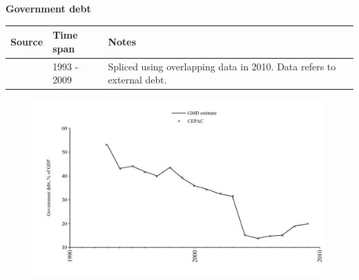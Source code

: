\documentclass[12pt,a4paper,landscape]{article}
\begin{document}
\begin{adjustbox}{max totalsize={\paperwidth}{\paperheight},center}
\begin{minipage}[t][\textheight][t]{\textwidth}
\vspace*{0.5cm}
{}
\begin{center}
{\Large\bfseries Government debt}
\end{center}
\vspace{0.5cm}
\begin{table}[H]
\centering
\small
\begin{tabular}{|l|l|l|}
\hline
\textbf{Source} & \textbf{Time span} & \textbf{Notes} \\
\hline
\rowcolor{white}\cite{CEPAC}& 1993 - 2009 &Spliced using overlapping data in 2010. Data refers to external debt.\\
\hline
\end{tabular}
\end{table}
\begin{figure}[H]
\centering
\includegraphics[width=\textwidth,height=0.6\textheight,keepaspectratio]{graphs/CUB_govdebt_GDP.pdf}
\end{figure}
\end{minipage}
\end{adjustbox}
\end{document}

